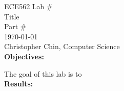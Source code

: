 \documentclass[11pt,a4paper]{article}
\begin{document}
{\parindent0pt
ECE562 Lab #\\
Title\\
Part #\\
\today\\
Christopher Chin, Computer Science\\

\textbf{Objectives:}

The goal of this lab is to\\

\textbf{Results:}
}
\end{document}
